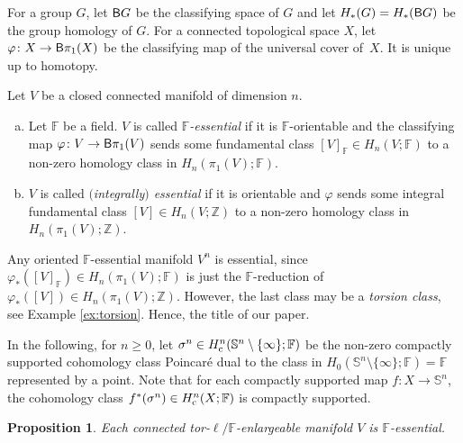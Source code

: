 \documentclass[pdftex]{sigma}
\numberwithin{equation}{section}
\newtheorem{Proposition}[Theorem]{Proposition}
\newcommand{\F}{\mathbb{F}}
\newcommand{\Z}{\mathbb{Z}}
\newcommand{\SSS}{\mathbb{S}}
\begin{document}
For a group $G$, let ${\sf B}G$ be the classifying space of $G$ and let $H_*(G) = H_*({\sf B}G)$ be the group homology of $G$.
For a connected topological space $X$, let
$\varphi \colon  X \to {\sf B} \pi_1(X)$
be the classifying map of the universal cover of~$X$.
It is unique up to homotopy.

\begin{Definition} \label{def:essential} Let $V$ be a closed connected manifold of dimension $n$.
\begin{enumerate}[(a)]\itemsep=0pt
\item Let $\F$ be a field.
$V$ is called {\em $\F$-essential} if it is $\F$-orientable and the classifying map $\varphi \colon V \to {\sf B}\pi_1(V)$ sends some fundamental class $[V] _\F \in H_{n}(V; \F)$ to a non-zero homology class in $H_n(\pi_1(V); \F)$.
\item $V$ is called {\em $($integrally$)$ essential} if it is orientable and $\varphi$ sends some integral fundamental class $[V] \in H_n(V;\Z)$ to a non-zero homology class in $H_n(\pi_1(V); \Z)$.
\end{enumerate}
\end{Definition}

Any oriented $\F$-essential manifold $V^n$ is essential, since $\varphi_*([V]_\F) \in H_n( \pi_1(V) ; \F)$ is just the $\F$-reduction of $\varphi_*([V]) \in H_n(\pi_1(V) ; \Z)$.
However, the last class may be a {\em torsion class}, see Example \ref{ex:torsion}.
Hence, the title of our paper.

In the following, for $n \geq 0$, let $\sigma^n \in H^{n}_{\rm c}(\SSS^{n} \setminus \{ \infty\}; \F)$ be the non-zero compactly supported cohomology class Poincar\'e dual to the class in $H_0( \SSS^{n} \setminus \{ \infty\}; \F) = \F$ represented by a point.
Note that for each compactly supported map $f \colon X \to \SSS^{n}$, the cohomology class $f^*(\sigma^n) \in H^{n}_{\rm c}(X; \F)$ is compactly supported.

\begin{Proposition} \label{special} Each connected tor-$\ell / \F$-enlargeable manifold $V$ is $\F$-essential.
\end{Proposition}
\end{document}
